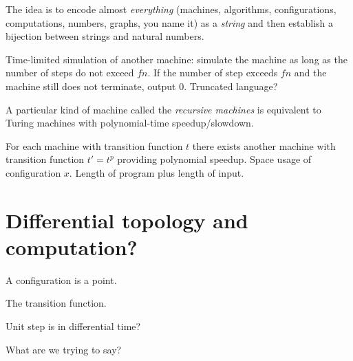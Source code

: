 The idea is to encode almost \emph{everything}
(machines, algorithms, configurations, computations, numbers, graphs, you name it)
as a \emph{string} and then establish a bijection between strings and natural numbers.

Time-limited simulation of another machine:
simulate the machine as long as the number of steps do not exceed $f n$.
If the number of step exceeds $f n$ and the machine still does not terminate,
output $0$.
Truncated language?

A particular kind of machine called the \emph{recursive machines}
is equivalent to Turing machines with polynomial-time speedup/slowdown.

For each machine with transition function $t$ there exists another machine
with transition function $t' = t^p$
providing polynomial speedup.
Space usage of configuration $x$.
Length of program plus length of input.

\section{Differential topology and computation?}

A configuration is a point.

The transition function.

Unit step is in differential time?

What are we trying to say?

